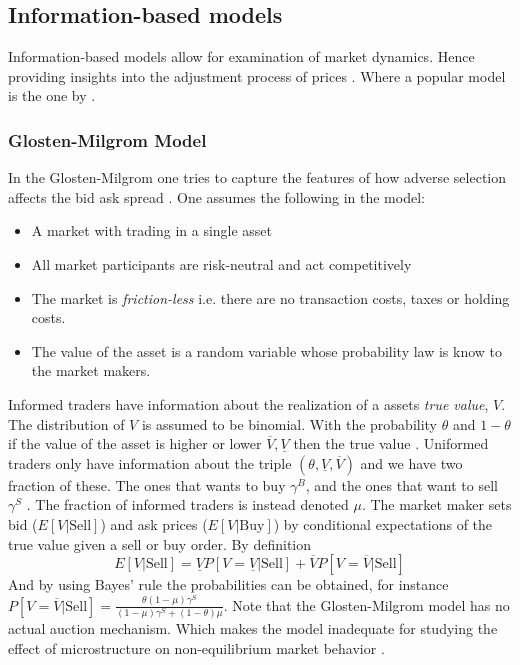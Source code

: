 \documentclass{kththesis}
\theoremstyle{definition}
\begin{document}
\subsection{Information-based models}
Information-based models allow for examination of market dynamics. Hence providing insights into the adjustment process of prices \parencite{o1995market}. Where a popular model is the one by \textcite{glosten1985bid}.

\subsubsection*{Glosten-Milgrom Model}
In the Glosten-Milgrom one tries to capture the features of how adverse selection affects the bid ask spread \parencite{darley2007nasdaq}. One assumes the following in the model:
\begin{itemize}
    \item A market with trading in a single asset
    \item All market participants are risk-neutral and act competitively
    \item The market is \textit{friction-less} i.e. there are no transaction costs, taxes or holding costs.
    \item The value of the asset is a random variable whose probability law is know to the market makers.
\end{itemize}
Informed traders have information about the realization of a assets \textit{true value}, $V$. The distribution of $V$ is assumed to be binomial. With the probability $\theta$ and $1- \theta$ if the value of the asset is higher or lower $\overline{V}, \underline{V}$  then the true value \parencite{darley2007nasdaq}. Uniformed traders only have information about the triple $(\theta, \underline{V}, \overline{V})$ and we have two fraction of these. The ones that wants to buy $\gamma^{B}$, and the ones that want to sell $\gamma^{S}$ \parencite{darley2007nasdaq}. The fraction of informed traders is instead denoted $\mu$. The market maker sets bid ($E[V|\text{Sell}]$) and ask prices ($E[V|\text{Buy}]$) by conditional expectations of the true value given a sell or buy order. By definition \parencite{darley2007nasdaq} 
\begin{equation}
    \label{eq:7}
    E[V|\text{Sell}] = \underline{V}P[V=\underline{V}|\text{Sell}] + \overline{V}P[V=\overline{V}|\text{Sell}]
\end{equation}
And by using Bayes' rule the probabilities  can be obtained, for instance $P[V=\overline{V}|\text{Sell}] = \frac{\theta(1-\mu)\gamma^{S}}{(1-\mu)\gamma^{S} + (1-\theta)\mu}$.
Note that the Glosten-Milgrom model has no actual auction mechanism. Which makes the model inadequate for studying the effect of microstructure on non-equilibrium market behavior \parencite{darley2007nasdaq}.
\end{document}
